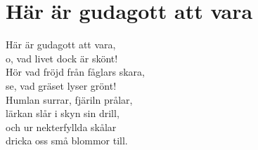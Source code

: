 \section{Här är gudagott att vara}

Här är gudagott att vara,\\
o, vad livet dock är skönt!\\
Hör vad fröjd från fåglars skara,\\
se, vad gräset lyser grönt!\\
Humlan surrar, fjäriln prålar,\\
lärkan slår i skyn sin drill,\\
och ur nekterfyllda skålar\\
dricka oss små blommor till.\\